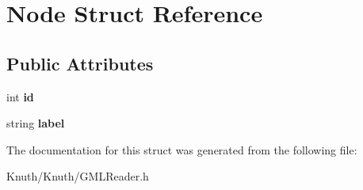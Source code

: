 \hypertarget{struct_node}{}\section{Node Struct Reference}
\label{struct_node}
\subsection*{Public Attributes}
\begin{DoxyCompactItemize}
\item 
\mbox{\label{struct_node_a59a543130a10c95f1e8642cf8c5645e8}} 
int {\bfseries id}
\item 
\mbox{\label{struct_node_a303618c90c74231cce2c097e3fdb7f02}} 
string {\bfseries label}
\end{DoxyCompactItemize}


The documentation for this struct was generated from the following file\+:\begin{DoxyCompactItemize}
\item 
Knuth/\+Knuth/G\+M\+L\+Reader.\+h\end{DoxyCompactItemize}
